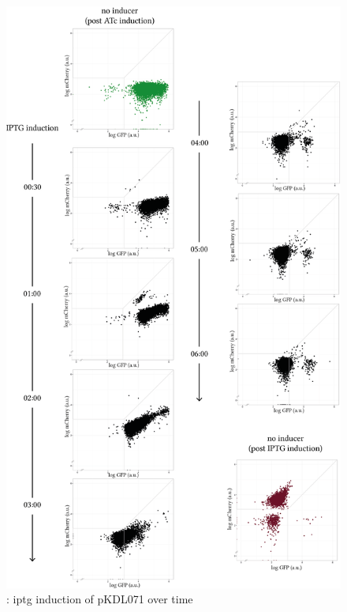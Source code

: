 \begin{figure}[tb]
	\begin{center}
\includegraphics[scale=0.7]{../../chapters/chapterABCFlow/images/pKDL071_iptg_time.png}
\caption[LoF caption]{\label{fig:switch_timecourse_iptg}: \acrshort{iptg} induction of pKDL071 over time}
\end{center}
\end{figure}
\clearpage


